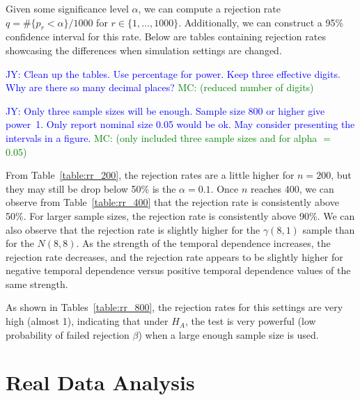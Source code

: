 \documentclass[12pt, titlepage, letterpaper]{article}
\newcommand{\jy}[1]{\textcolor{blue}{JY: #1}}
\newcommand{\mc}[1]{\textcolor{green}{MC: (#1)}}
\begin{document}
{Given some significance level $\alpha$, we can compute a rejection rate 
$q = \#\{p_r < \alpha\} / 1000$ for $r \in \{1, \ldots, 1000\}$.
Additionally, we can construct a 95\% confidence interval for 
this rate. Below are tables containing rejection rates showcasing the 
differences when simulation settings are changed.

\jy{Clean up the tables. Use percentage for power. Keep three effective
  digits. Why are there so many decimal places? }
\mc{reduced number of digits}

\jy{Only three sample sizes will be enough. Sample size 800 or higher give
  power~1. Only report nominal size 0.05 would be ok. May consider presenting
  the intervals in a figure.}
\mc{only included three sample sizes and for alpha $=$ 0.05}









From 
Table~\ref{table:rr_200}, 
the rejection rates are a little higher for $n = 200$, but they may still be 
drop below 50\% is the $\alpha = 0.1$. Once $n$ reaches 400, we can observe 
from Table~\ref{table:rr_400} that the rejection rate
is consistently above 50\%. For larger sample sizes, the rejection rate is 
consistently above 90\%. We can also
observe that the rejection rate is slightly higher for the $\gamma(8, 1)$ sample 
than for 
the $N(8, 8)$. As the strength of the temporal dependence increases, the 
rejection rate decreases, and the rejection
rate appears to be slightly higher for negative temporal dependence versus 
positive temporal dependence values of the same strength.


As shown in Tables~\ref{table:rr_800}, the rejection rates for this settings 
are very 
high (almost 1), indicating that under $H_A$, the test is very powerful 
(low probability of failed rejection $\beta$) when a large enough
sample size is used.


\section{Real Data Analysis}
\label{sec:real}

}
\end{document}
